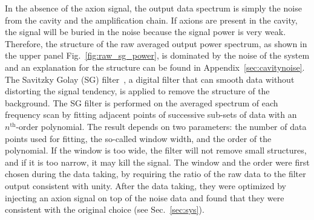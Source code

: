 In the absence of the axion signal, the output data spectrum is simply the 
noise from the cavity and the amplification chain. If axions are present 
in the cavity, the signal will be buried in the noise because the 
signal power is very weak. Therefore, the structure of the raw averaged 
output power spectrum, as shown in the upper panel 
Fig.~\ref{fig:raw_sg_power}, is dominated 
by the noise of the system and an explanation for the structure can be found 
in Appendix~\ref{sec:cavitynoise}. The Savitzky Golay (SG) 
filter~\cite{SGFilter}, a digital filter that can smooth data without 
distorting the signal tendency, is applied to remove the structure of the  
background. The SG filter is performed on the averaged spectrum of each 
frequency scan by fitting adjacent points of successive sub-sets of data with 
an $n^\text{th}$-order polynomial. The result depends on two parameters: 
the number of 
data points used for fitting, the so-called window width, and the order of 
the polynomial. If the window is too wide, the filter will not remove small 
structures, and if it is too narrow, it may kill the signal. 
The window and the order were first chosen during the data taking, by 
requiring the ratio of the raw data to the filter 
output consistent with unity.  
After the data taking, they were optimized by injecting an axion signal on 
top of 
the noise data and found that they were consistent with the original choice 
(see Sec.~\ref{sec:sys}). 

